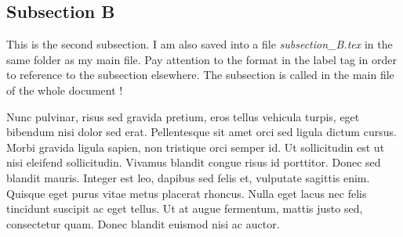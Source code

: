 \subsection{Subsection B}
\label{subsec:B} 

This is the second subsection. I am also saved into a file \textit{subsection\_B.tex} in the same folder as my main file. Pay attention to the format in the label tag in order to reference to the subsection elsewhere. The subsection is called in the main file of the whole document !

\medskip Nunc pulvinar, risus sed gravida pretium, eros tellus vehicula turpis, eget bibendum nisi dolor sed erat. Pellentesque sit amet orci sed ligula dictum cursus. Morbi gravida ligula sapien, non tristique orci semper id. Ut sollicitudin est ut nisi eleifend sollicitudin. Vivamus blandit congue risus id porttitor. Donec sed blandit mauris. Integer est leo, dapibus sed felis et, vulputate sagittis enim. Quisque eget purus vitae metus placerat rhoncus. Nulla eget lacus nec felis tincidunt suscipit ac eget tellus. Ut at augue fermentum, mattis justo sed, consectetur quam. Donec blandit euismod nisi ac auctor.